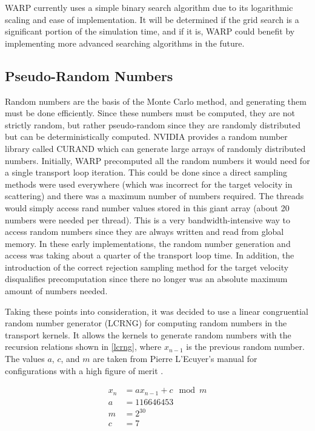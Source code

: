 WARP currently uses a simple binary search algorithm due to its logarithmic scaling and ease of implementation.  It will be determined if the grid search is a significant portion of the simulation time, and if it is, WARP could benefit by implementing more advanced searching algorithms in the future.

\subsection{Pseudo-Random Numbers}

Random numbers are the basis of the Monte Carlo method, and generating them must be done efficiently.  Since these numbers must be computed, they are not strictly random, but rather pseudo-random since they are randomly distributed but can be deterministically computed.  NVIDIA provides a random number library called CURAND which can generate large arrays of randomly distributed numbers.  Initially, WARP precomputed all the random numbers it would need for a single transport loop iteration.  This could be done since a direct sampling methods were used everywhere (which was incorrect for the target velocity in scattering) and there was a maximum number of numbers required.  The threads would simply access rand number values stored in this giant array (about 20 numbers were needed per thread).  This is a very bandwidth-intensive way to access random numbers since they are always written and read from global memory.  In these early implementations, the random number generation and access was taking about a quarter of the transport loop time.  In addition, the introduction of the correct rejection sampling method for the target velocity disqualifies precomputation since there no longer was an absolute maximum amount of numbers needed.

Taking these points into consideration, it was decided to use a linear congruential random number generator (LCRNG) for computing random numbers in the transport kernels.  It allows the kernels to generate random numbers with the recursion relations shown in \eqref{lcrng}, where $x_{n-1}$ is the previous random number.  The values $a$, $c$, and $m$ are taken from Pierre L'Ecuyer's manual for configurations with a high figure of merit \cite{lcrng}.   

\begin{equation}
\begin{split}
x_{n} &= a x_{n-1} + c \mod m  \\
a &= 116646453 \\
m &=  2^{30} \\
c &= 7
\end{split}
\label{lcrng}
\end{equation}

